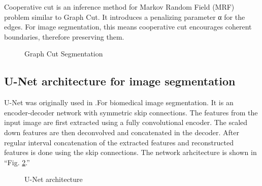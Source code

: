 \documentclass[conference]{IEEEtran}
\begin{document}
Cooperative cut \cite{CoopCut} is an inference method for Markov Random Field (MRF) problem similar to Graph Cut. It introduces a penalizing parameter α for the edges. For image segmentation, this means cooperative cut encourages coherent boundaries, therefore preserving them.
\begin{figure}[htbp]
\caption{Graph Cut Segmentation}
\label{fig:graph_cut}
\end{figure}


\subsection{U-Net architecture for image segmentation } \label{un}
U-Net was originally used in \cite{unet} .For biomedical image segmentation. It is an encoder-decoder network with symmetric skip connections. The features from the input image are first extracted using a fully convolutional encoder. The scaled down features are then deconvolved and concatenated in the decoder. After regular interval concatenation of the extracted features and reconstructed features is done using the skip connections. The network arhcitecture is shown in ``Fig. \ref{fig:unet}.'' \\

\begin{figure}[htbp]
\caption{U-Net architecture}
\label{fig:unet}
\end{figure}
\end{document}
